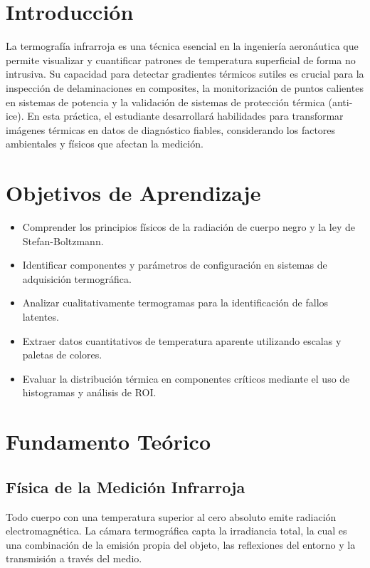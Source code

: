\documentclass[11pt, a4paper]{article}
\begin{document}
\section{Introducción}
La termografía infrarroja es una técnica esencial en la ingeniería aeronáutica que permite visualizar y cuantificar patrones de temperatura superficial de forma no intrusiva. Su capacidad para detectar gradientes térmicos sutiles es crucial para la inspección de delaminaciones en composites, la monitorización de puntos calientes en sistemas de potencia y la validación de sistemas de protección térmica (anti-ice). En esta práctica, el estudiante desarrollará habilidades para transformar imágenes térmicas en datos de diagnóstico fiables, considerando los factores ambientales y físicos que afectan la medición.

\section{Objetivos de Aprendizaje}
\begin{itemize}[label=-]
    \item Comprender los principios físicos de la radiación de cuerpo negro y la ley de Stefan-Boltzmann.
    \item Identificar componentes y parámetros de configuración en sistemas de adquisición termográfica.
    \item Analizar cualitativamente termogramas para la identificación de fallos latentes.
    \item Extraer datos cuantitativos de temperatura aparente utilizando escalas y paletas de colores.
    \item Evaluar la distribución térmica en componentes críticos mediante el uso de histogramas y análisis de ROI.
\end{itemize}

\section{Fundamento Teórico}

\subsection{Física de la Medición Infrarroja}
Todo cuerpo con una temperatura superior al cero absoluto emite radiación electromagnética. La cámara termográfica capta la irradiancia total, la cual es una combinación de la emisión propia del objeto, las reflexiones del entorno y la transmisión a través del medio.
\end{document}
